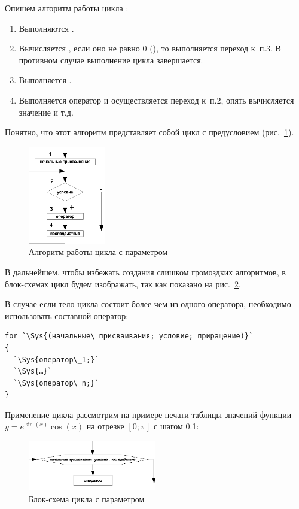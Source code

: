 Опишем алгоритм работы цикла :
\begin{enumerate}
\item Выполняются .
\item Вычисляется , если оно не равно 0 (), то выполняется переход к~п.3.
В противном случае выполнение цикла завершается.
\item Выполняется . 
\item Выполняется оператор  и осуществляется переход к~п.2,  опять вычисляется значение
 и т.д.
\end{enumerate}
Понятно, что этот алгоритм представляет собой цикл с предусловием (рис.~\ref{ch03:refDrawing24}).
\begin{figure}[htb]
\begin{center}
\includegraphics[width=0.3\textwidth]{img/ris_3_25}
\caption{Алгоритм работы цикла с параметром}
\label{ch03:refDrawing24}
\end{center}
\end{figure}

В дальнейшем, чтобы избежать создания слишком громоздких алгоритмов, в блок-схемах цикл  будем
изображать, так как показано на рис.~\ref{ch03:refDrawing25}.

В случае если тело цикла состоит более чем из одного оператора, необходимо использовать составной оператор:
\begin{lstlisting}
for `\Sys{(начальные\_присваивания; условие; приращение)}`
{
  `\Sys{оператор\_1;}`
  `\Sys{…}`
  `\Sys{оператор\_n;}`
}
\end{lstlisting}
Применение цикла  рассмотрим на примере печати таблицы значений функции  $y=e^{\sin (x)}\cos (x)$
на отрезке  $[0;\pi]$  с шагом 0.1:
\begin{figure}[htb]
\begin{center}
\includegraphics[width=0.5\textwidth]{img/ris_3_26}
\caption{Блок-схема цикла с параметром}
\label{ch03:refDrawing25}
\end{center}
\end{figure}

